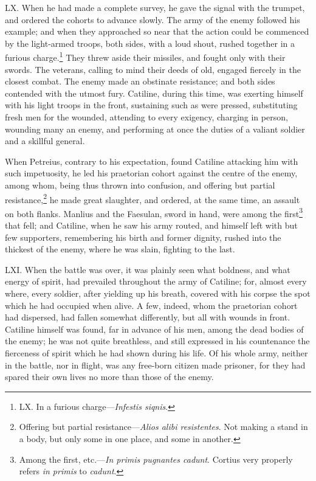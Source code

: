 LX. When he had made a complete survey, he gave the signal with the
trumpet, and ordered the cohorts to advance slowly. The army of the
enemy followed his example; and when they approached so near that the
action could be commenced by the light-armed troops, both sides, with
a loud shout, rushed together in a furious charge.\footnote{LX. In a furious charge—\emph{Infestis siqnis}.} They threw
aside their missiles, and fought only with their swords. The veterans,
calling to mind their deeds of old, engaged fiercely in the closest
combat. The enemy made an obstinate resistance; and both sides
contended with the utmost fury. Catiline, during this time, was
exerting himself with his light troops in the front, sustaining such
as were pressed, substituting fresh men for the wounded, attending to
every exigency, charging in person, wounding many an enemy, and
performing at once the duties of a valiant soldier and a skillful
general.

When Petreius, contrary to his expectation, found Catiline attacking
him with such impetuosity, he led his praetorian cohort against the
centre of the enemy, among whom, being thus thrown into confusion, and
offering but partial resistance,\footnote{Offering but partial resistance—\emph{Alios alibi resistentes}.
Not making a stand in a body, but only some in one place, and some in
another.} he made great slaughter, and
ordered, at the same time, an assault on both flanks. Manlius and the
Faesulan, sword in hand, were among the first\footnote{Among the first, etc.—\emph{In primis pugnantes cadunt}. Cortius
very properly refers \emph{in primis} to \emph{cadunt}.} that fell; and
Catiline, when he saw his army routed, and himself left with but few
supporters, remembering his birth and former dignity, rushed into the
thickest of the enemy, where he was slain, fighting to the last.

LXI. When the battle was over, it was plainly seen what boldness, and
what energy of spirit, had prevailed throughout the army of Catiline;
for, almost every where, every soldier, after yielding up his breath,
covered with his corpse the spot which he had occupied when alive. A
few, indeed, whom the praetorian cohort had dispersed, had fallen
somewhat differently, but all with wounds in front. Catiline himself
was found, far in advance of his men, among the dead bodies of the
enemy; he was not quite breathless, and still expressed in his
countenance the fierceness of spirit which he had shown during his
life. Of his whole army, neither in the battle, nor in flight, was any
free-born citizen made prisoner, for they had spared their own lives
no more than those of the enemy.


